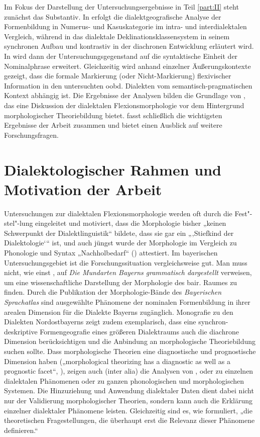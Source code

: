 Im Fokus der Darstellung der Untersuchungsergebnisse in Teil \ref{part:II} steht zunächst das Substantiv. In  erfolgt die dialektgeografische Analyse der Formenbildung in Numerus- und Kasuskategorie im intra- und interdialektalen Vergleich, während in  das dialektale Deklinationsklassensystem in seinem synchronen Aufbau und kontrastiv in der diachronen Entwicklung erläutert wird. In  wird dann der Untersuchungsgegenstand auf die syntaktische Einheit der Nominalphrase erweitert. Gleichzeitig wird anhand einzelner Äußerungskontexte gezeigt, dass die formale Markierung (oder Nicht-Markierung) flexivischer Information in den untersuchten oobd. Dialekten vom semantisch-pragmatischen Kontext abhängig ist. Die Ergebnisse der Analysen bilden die Grundlage von , das eine Diskussion der dialektalen Flexionsmorphologie vor dem Hintergrund morphologischer Theoriebildung bietet.  fasst schließlich die wichtigsten Ergebnisse der Arbeit zusammen und bietet einen Ausblick auf weitere Forschungsfragen.

\chapter{Dialektologischer Rahmen und Motivation der Arbeit}
\label{chap:2}
Untersuchungen zur dialektalen Flexionsmorphologie werden oft durch die Fest"-stel"-lung eingeleitet und motiviert, dass die Morphologie bisher „keinen Schwerpunkt der Dialektlinguistik“ \citep[44]{Nübling2005} bildete, dass sie gar ein „‚Stiefkind der Dialektologie‘“ \citep[1]{Rowley1997} ist, und auch jüngst wurde der Morphologie im Vergleich zu Phonologie und Syntax „Nachholbedarf“ (\citealt[35]{SchmidtEtAl2019}) attestiert. Im bayerischen Untersuchungsgebiet ist die Forschungssituation vergleichsweise gut. Man muss nicht, wie einst \citet[1]{Rowley1997}, auf  \textit{Die Mundarten Bayerns grammatisch dargestellt} verweisen, um eine wissenschaftliche Darstellung der Morphologie des bair. Raumes zu finden. Durch die Publikation der Morphologie-Bände des \textit{Bayerischen Sprachatlas} sind ausgewählte Phänomene der nominalen Formenbildung in ihrer arealen Dimension für die Dialekte Bayerns zugänglich.  Monografie zu den Dialekten Nordostbayerns zeigt zudem exemplarisch, dass eine synchron-deskriptive Formengeografie eines größeren Dialektraums auch die diachrone Dimension berücksichtigen und die Anbindung an morphologische Theoriebildung suchen sollte. Dass morphologische Theorien eine diagnostische und prognostische Dimension haben („morphological theorizing has a diagnostic as well as a prognostic facet“, \citealt[2]{SchallertDammel2019}), zeigen auch (inter alia) die Analysen von \citet{Birkenes2014}, \citet{Harnisch1987} oder \citet{Seiler2003} zu einzelnen dialektalen Phänomenen oder zu ganzen phonologischen und morphologischen Systemen. Die Hinzuziehung und Anwendung dialektaler Daten dient dabei nicht nur der Validierung morphologischer Theorien, sondern kann auch die Erklärung einzelner dialektaler Phänomene leisten. Gleichzeitig sind es, wie \citet[16]{Seiler2003} formuliert, „die theoretischen Fragestellungen, die überhaupt erst die Relevanz dieser Phänomene definieren.“

